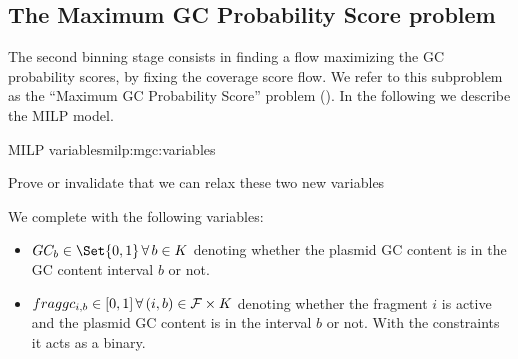 \subsection{The Maximum GC Probability Score problem \MGC{}}\label{sec:method:mgc}

The second binning stage consists in finding a flow maximizing the GC probability scores, by fixing the coverage score flow.
We refer to this subproblem as the \enquote{Maximum GC Probability Score} problem (\MGC{}).
In the following we describe the MILP model.

\begin{definition}{\MGC{} MILP variables}{milp:mgc:variables}
  \begin{todobox}
    Prove or invalidate that we can relax these two new variables
  \end{todobox}
  We complete  with the following variables:
  \begin{itemize}
    \item \(GC_b \in \Set{0, 1} \, \forall b \in K\) denoting whether the plasmid GC content is in the GC content interval \(b\) or not.
    \item \(\fraggc{i}{b} \in [0, 1] \, \forall (i, b) \in \Fragments{} \times K\) denoting whether the fragment \(i\) is active and the plasmid GC content is in the interval \(b\) or not. With the constraints it acts as a binary.
  \end{itemize}
\end{definition}

